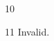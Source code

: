 \documentclass[paper=A4]{ropas-poster}
\begin{document}
\begin{postergrid}{1}{0}
\begin{posterblock}{1}{1}
Invalid.
\end{posterblock}
\end{postergrid}
\end{document}
